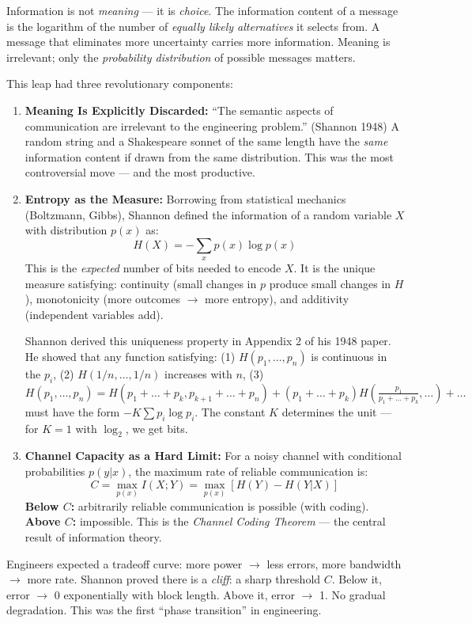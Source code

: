 Information is not \emph{meaning} — it is \emph{choice}. The information content of a message is the logarithm of the number of \emph{equally likely alternatives} it selects from. A message that eliminates more uncertainty carries more information. Meaning is irrelevant; only the \emph{probability distribution} of possible messages matters.

This leap had three revolutionary components:

\begin{enumerate}
\item \textbf{Meaning Is Explicitly Discarded:} ``The semantic aspects of communication are irrelevant to the engineering problem.'' (Shannon 1948) A random string and a Shakespeare sonnet of the same length have the \emph{same} information content if drawn from the same distribution. This was the most controversial move — and the most productive.

\item \textbf{Entropy as the Measure:} Borrowing from statistical mechanics (Boltzmann, Gibbs), Shannon defined the information of a random variable $X$ with distribution $p(x)$ as:
\[
H(X) = -\sum_x p(x) \log p(x)
\]
This is the \emph{expected} number of bits needed to encode $X$. It is the unique measure satisfying: continuity (small changes in $p$ produce small changes in $H$), monotonicity (more outcomes $\to$ more entropy), and additivity (independent variables add).

Shannon derived this uniqueness property in Appendix 2 of his 1948 paper. He showed that any function satisfying: (1) $H(p_1,\dots,p_n)$ is continuous in the $p_i$, (2) $H(1/n,\dots,1/n)$ increases with $n$, (3) $H(p_1,\dots,p_n) = H(p_1+\dots+p_k, p_{k+1}+\dots+p_n) + (p_1+\dots+p_k)H(\frac{p_1}{p_1+\dots+p_k},\dots) + \dots$ must have the form $-K\sum p_i\log p_i$. The constant $K$ determines the unit — for $K=1$ with $\log_2$, we get bits.

\item \textbf{Channel Capacity as a Hard Limit:} For a noisy channel with conditional probabilities $p(y|x)$, the maximum rate of reliable communication is:
\[
C = \max_{p(x)} I(X;Y) = \max_{p(x)} [H(Y) - H(Y|X)]
\]
\textbf{Below $C$:} arbitrarily reliable communication is possible (with coding). \textbf{Above $C$:} impossible. This is the \emph{Channel Coding Theorem} — the central result of information theory.
\end{enumerate}

Engineers expected a tradeoff curve: more power $\to$ less errors, more bandwidth $\to$ more rate. Shannon proved there is a \emph{cliff}: a sharp threshold $C$. Below it, error $\to$ 0 exponentially with block length. Above it, error $\to$ 1. No gradual degradation. This was the first ``phase transition'' in engineering.

